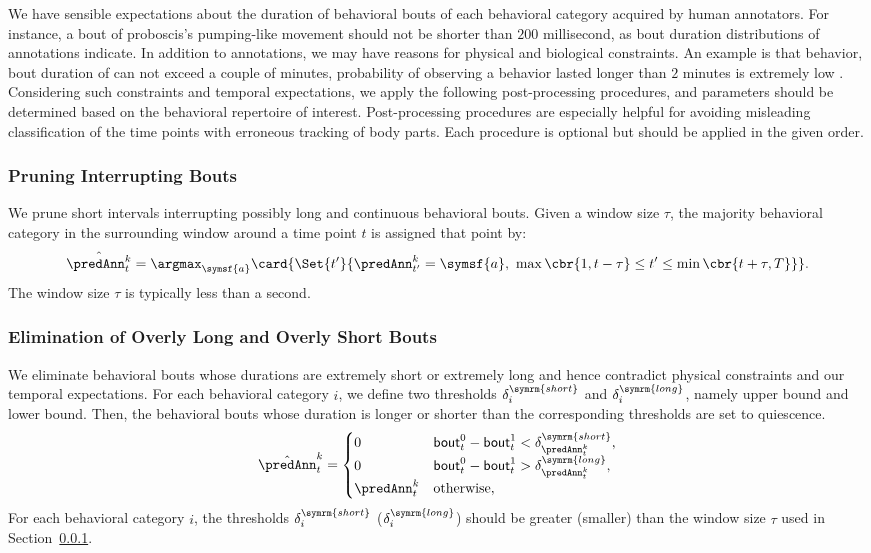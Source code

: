 We have sensible expectations about the duration of behavioral bouts of each behavioral category acquired by human annotators.
For instance, a bout of proboscis's pumping-like movement should not be shorter than $200$ millisecond, as bout duration distributions of annotations indicate.
In addition to annotations, we may have reasons for physical and biological constraints.
An example is that \Grooming behavior, bout duration of \Grooming can not exceed a couple of minutes, probability of observing a \Grooming behavior lasted longer than $2$ minutes is extremely low \citep{qiao_automated_2018}.
Considering such constraints and temporal expectations, we apply the following post-processing procedures, and parameters should be determined based on the behavioral repertoire of interest.
Post-processing procedures are especially helpful for avoiding misleading classification of the time points with erroneous tracking of body parts.
Each procedure is optional but should be applied in the given order.

\subsubsection{Pruning Interrupting Bouts}\label{section:pruning-interrupting-bouts}
We prune short intervals interrupting possibly long and continuous behavioral bouts.
Given a window size $\tau$, the majority behavioral category in the surrounding window around a time point $t$ is assigned that point by:
\begin{equation}
	\hat{\predAnn^k_t} = \argmax_{\symsf{a}} \card{\Set{t^\prime}{\predAnn^k_{t^\prime}=\symsf{a}, \ \max\cbr{1, t-\tau} \leq t^\prime \leq \min\cbr{t+\tau, T}}}.
\end{equation}
The window size $\tau$ is typically less than a second.

\subsubsection{Elimination of Overly Long and Overly Short Bouts}
We eliminate behavioral bouts whose durations are extremely short or extremely long and hence contradict physical constraints and our temporal expectations.
For each behavioral category $i$, we define two thresholds $\delta^{\symrm{short}}_i$ and $\delta^{\symrm{long}}_i$, namely upper bound and lower bound.
Then, the behavioral bouts whose duration is longer or shorter than the corresponding thresholds are set to quiescence.
\begin{equation}
	\hat{\predAnn}^k_t=
	\begin{cases}
		0            & \mathsf{bout}^0_t - \mathsf{bout}^1_t < \delta^{\symrm{short}}_{\predAnn^k_t}, \\
		0            & \mathsf{bout}^0_t - \mathsf{bout}^1_t > \delta^{\symrm{long}}_{\predAnn^k_t},  \\
		\predAnn^k_t & \textnormal{otherwise},
	\end{cases}
\end{equation}
For each behavioral category $i$, the thresholds $\delta^{\symrm{short}}_i$ ($\delta^{\symrm{long}}_i$) should be greater (smaller) than the window size $\tau$ used in Section~\ref{section:pruning-interrupting-bouts}.
